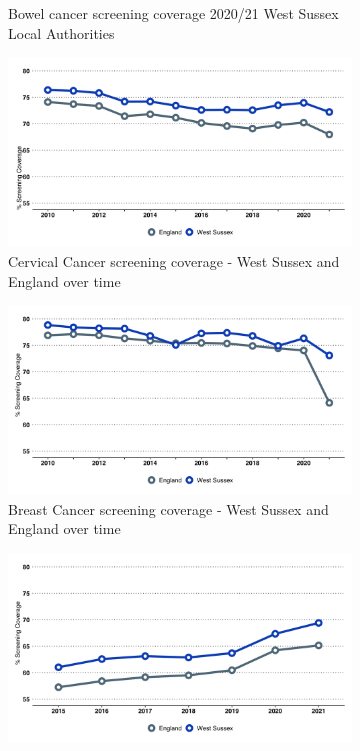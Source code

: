 \begin{figure}
\begin{subfigure}[b]{0.3\textwidth}
        \caption{Bowel cancer screening coverage 2020/21 West Sussex Local Authorities}
        \label{fig:bowel:rag}
    \end{subfigure}
    \begin{subfigure}[b]{0.3\textwidth}
        \centering
        \includegraphics[width=\textwidth]{images/cervical_cancer_screening.png}
        \caption{Cervical Cancer screening coverage - West Sussex and England over time}
        \label{fig:cervical:time}
    \end{subfigure}
    \begin{subfigure}[b]{0.3\textwidth}
        \centering
        \includegraphics[width=\textwidth]{images/breast_cancer_screening.png}
        \caption{Breast Cancer screening coverage - West Sussex and England over time}
        \label{fig:breast:time}
    \end{subfigure}
    \begin{subfigure}[b]{0.3\textwidth}
        \centering
        \includegraphics[width=\textwidth]{images/bowel_cancer_screening.png}

\end{subfigure}
\end{figure}
